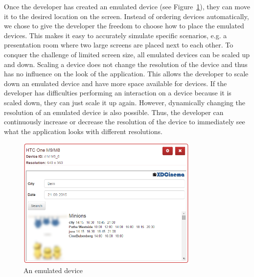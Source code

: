Once the developer has created an emulated device (see Figure~\ref{fig:emulated_device}), they can move it to the desired location on the screen. Instead of ordering devices automatically, we chose to give the developer the freedom to choose how to place the emulated devices. This makes it easy to accurately simulate specific scenarios, e.g. a presentation room where two large screens are placed next to each other. To conquer the challenge of limited screen size, all emulated devices can be scaled up and down. Scaling a device does not change the resolution of the device and thus has no influence on the look of the application. This allows the developer to scale down an emulated device and have more space available for devices. If the developer has difficulties performing an interaction on a device because it is scaled down, they can just scale it up again. However, dynamically changing the resolution of an emulated device is also possible. Thus, the developer can continuously increase or decrease the resolution of the device to immediately see what the application looks with different resolutions.

\begin{figure}[H]
  \centering
    \includegraphics[width=0.8\textwidth]{images/screenshots/emulated_device_3.png}
	\caption[Screenshot: Emulated device]{An emulated device}
	\label{fig:emulated_device}
\end{figure}

